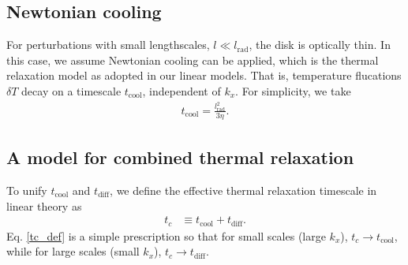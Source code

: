 \subsection{Newtonian cooling}\label{newton_cool}
For perturbations with small lengthscales, $l\ll l_\mathrm{rad}$, 
the disk is optically thin. In this case, we assume 
Newtonian cooling can be applied, which is the thermal
relaxation model as adopted in our linear models. That is, temperature
flucations $\delta T$ decay on a timescale $t_\mathrm{cool}$,
independent of $k_x$. For simplicity, we take  
\begin{align}
t_\mathrm{cool} = \frac{l_\mathrm{rad}^2}{3\eta}. 
\end{align}

\subsection{A model for combined thermal relaxation}\label{toy_relax}
To unify $t_\mathrm{cool}$ and $t_\mathrm{diff}$, we define the
effective thermal relaxation timescale in linear theory as
\begin{align}\label{tc_def}
  t_c &\equiv t_\mathrm{cool} + t _\mathrm{diff}. %
\end{align}
Eq. \ref{tc_def} is a simple prescription so
that for small scales (large $k_x$), $t_c\to t_\mathrm{cool}$, while
for large scales (small $k_x$), $t_c\to t_\mathrm{diff}$. 

